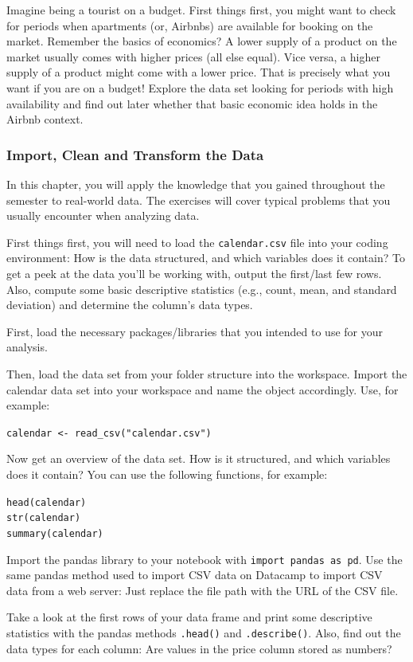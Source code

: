 \documentclass[
  11pt,
]{article}
\newenvironment{tips}[1]
  {
  \begin{itemize}
  \footnotesize
  \renewcommand{\labelitemi}{
    \raisebox{-.7\height}[0pt][0pt]{
      {\setkeys{Gin}{width=3em,keepaspectratio}
        \texttt{[image: images/\#1.png]}}
    }
  }
  \setlength{\fboxsep}{1em}
  \begin{rbox}
  \item
  }
  {
  \end{rbox}
  \end{itemize}
  }
\newenvironment{tipsp}[1]
  {
  \begin{itemize}
  \footnotesize
  \renewcommand{\labelitemi}{
    \raisebox{-.7\height}[0pt][0pt]{
      {\setkeys{Gin}{width=3em,keepaspectratio}
        \texttt{[image: images/\#1.png]}}
    }
  }
  \setlength{\fboxsep}{1em}
  \begin{pbox}
  \item
  }
  {
  \end{pbox}
  \end{itemize}
  }
\begin{document}
Imagine being a tourist on a budget.
First things first, you might want to check for periods when apartments (or, Airbnbs) are available for booking on the market.
Remember the basics of economics?
A lower supply of a product on the market usually comes with higher prices (all else equal).
Vice versa, a higher supply of a product might come with a lower price.
That is precisely what you want if you are on a budget!
Explore the data set looking for periods with high availability and find out later whether that basic economic idea holds in the Airbnb context.

\hypertarget{import-clean-and-transform-the-data}{%
\subsubsection{Import, Clean and Transform the Data}\label{import-clean-and-transform-the-data}}

In this chapter, you will apply the knowledge that you gained throughout the semester to real-world data.
The exercises will cover typical problems that you usually encounter when analyzing data.

First things first, you will need to load the \texttt{calendar.csv} file into your coding environment: How is the data structured, and which variables does it contain?
To get a peek at the data you'll be working with, output the first/last few rows.
Also, compute some basic descriptive statistics (e.g., count, mean, and standard deviation) and determine the column's data types.

\begin{tips}r
First, load the necessary packages/libraries that you intended to use for your analysis.

Then, load the data set from your folder structure into the workspace.
Import the calendar data set into your workspace and name the object accordingly.
Use, for example:

\texttt{calendar\ \textless{}-\ read\_csv("calendar.csv")}

Now get an overview of the data set.
How is it structured, and which variables does it contain?
You can use the following functions, for example:

\texttt{head(calendar)}~\\
\texttt{str(calendar)}~\\
\texttt{summary(calendar)}

\end{tips}

\begin{tipsp}p
Import the pandas library to your notebook with \texttt{import\ pandas\ as\ pd}.
Use the same pandas method used to import CSV data on Datacamp to import CSV data from a web server: Just replace the file path with the URL of the CSV file.

Take a look at the first rows of your data frame and print some descriptive statistics with the pandas methods \texttt{.head()} and \texttt{.describe()}.
Also, find out the data types for each column: Are values in the price column stored as numbers?

\end{tipsp}
\end{document}
